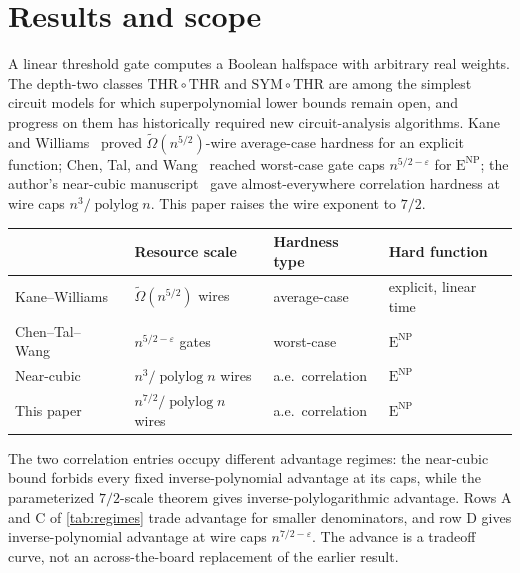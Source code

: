 \documentclass[11pt,letterpaper]{article}
\theoremstyle{definition}
\theoremstyle{remark}
\newcommand{\THR}{\mathrm{THR}}
\newcommand{\SYM}{\mathrm{SYM}}
\newcommand{\ENP}{\mathrm{E}^{\mathrm{NP}}}
\newcommand{\polylog}{\operatorname{polylog}}
\begin{document}
\setcounter{page}{1}
\hypersetup{pageanchor=true}
{\small\setcounter{tocdepth}{1}\tableofcontents}
\clearpage

\section{Results and scope}
\label{sec:results}

A linear threshold gate computes a Boolean halfspace with arbitrary
real weights. The depth-two classes $\THR\circ\THR$ and
$\SYM\circ\THR$ are among the simplest circuit models for which
superpolynomial lower bounds remain open, and progress on them has
historically required new circuit-analysis algorithms. Kane and
Williams~\cite{KaneWilliams} proved $\widetilde\Omega(n^{5/2})$-wire
average-case hardness for an explicit function; Chen, Tal, and
Wang~\cite{CTW} reached worst-case gate caps $n^{5/2-\varepsilon}$
for $\ENP$; the author's near-cubic manuscript~\cite{NagCubic} gave
almost-everywhere correlation hardness at wire caps $n^3/\polylog n$.
This paper raises the wire exponent to $7/2$.

\begin{center}
\small
\begin{tabular}{@{}llll@{}}
\toprule
 & Resource scale & Hardness type & Hard function\\
\midrule
Kane--Williams~\cite{KaneWilliams} & $\widetilde\Omega(n^{5/2})$ wires & average-case & explicit, linear time\\
Chen--Tal--Wang~\cite{CTW} & $n^{5/2-\varepsilon}$ gates & worst-case & $\ENP$\\
Near-cubic~\cite{NagCubic} & $n^{3}/\polylog n$ wires & a.e.\ correlation & $\ENP$\\
This paper & $n^{7/2}/\polylog n$ wires & a.e.\ correlation & $\ENP$\\
\bottomrule
\end{tabular}
\end{center}

The two correlation entries occupy different advantage regimes: the
near-cubic bound forbids every fixed inverse-polynomial advantage at
its caps, while the parameterized $7/2$-scale theorem gives
inverse-polylogarithmic advantage. Rows A and C of \cref{tab:regimes}
trade advantage for smaller denominators, and row D gives
inverse-polynomial advantage at wire caps $n^{7/2-\varepsilon}$.
The advance is a tradeoff curve, not an across-the-board replacement
of the earlier result.
\end{document}
